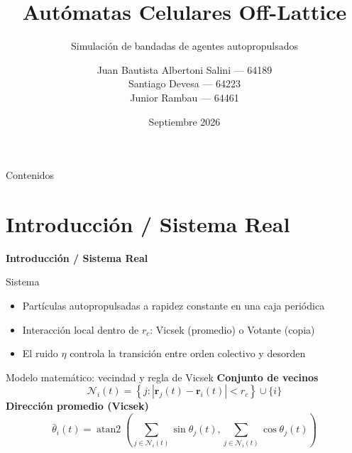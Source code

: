 \documentclass[aspectratio=169]{beamer}
\title{Autómatas Celulares Off-Lattice}
\subtitle{Simulación de bandadas de agentes autopropulsados}
\author{\texorpdfstring{%
  Juan Bautista Albertoni Salini --- 64189\\[0.25em]
  Santiago Devesa --- 64223\\[0.25em]
  Junior Rambau --- 64461%
}{Juan Bautista Albertoni Salini 64189; Santiago Devesa 64223; Junior Rambau 64461}}
\institute{(72.25) Simulación de Sistemas --- ITBA}
\date{Septiembre 2026}
\newcommand{\seccion}[1]{%
  \begin{frame}
    \vfill
    \begin{center}{\Huge\bfseries #1}\end{center}
    \vfill
  \end{frame}
}
\begin{document}
\begin{frame}
  \titlepage
\end{frame}

\begin{frame}{Contenidos}
  \tableofcontents
\end{frame}

\section{Introducción / Sistema Real}

\seccion{Introducción / Sistema Real}

\begin{frame}{Sistema}
  \begin{itemize}
    \setlength{\itemsep}{1em}
    \item Partículas autopropulsadas a rapidez constante en una caja periódica
    \item Interacción local dentro de $r_c$: Vicsek (promedio) o Votante (copia)
    \item El ruido $\eta$ controla la transición entre orden colectivo y desorden
  \end{itemize}
\end{frame}

\begin{frame}{Modelo matemático: vecindad y regla de Vicsek}
  \Large
  \vspace{0.6em}
  \textbf{Conjunto de vecinos}
  \vspace{0.5em}
  \[
    \mathcal{N}_i(t) =
    \left\{j:\left|\mathbf{r}_j(t)-\mathbf{r}_i(t)\right|<r_c\right\}
    \cup \{i\}
  \]
  \vspace{1.5em}
  \textbf{Dirección promedio (Vicsek)}
  \vspace{0.5em}
  \[
    \bar{\theta}_i(t) = \operatorname{atan2}\!\left(
      \sum_{j \in \mathcal{N}_i(t)} \sin\theta_j(t),
      \sum_{j \in \mathcal{N}_i(t)} \cos\theta_j(t)
    \right)
  \]
\end{frame}
\end{document}
